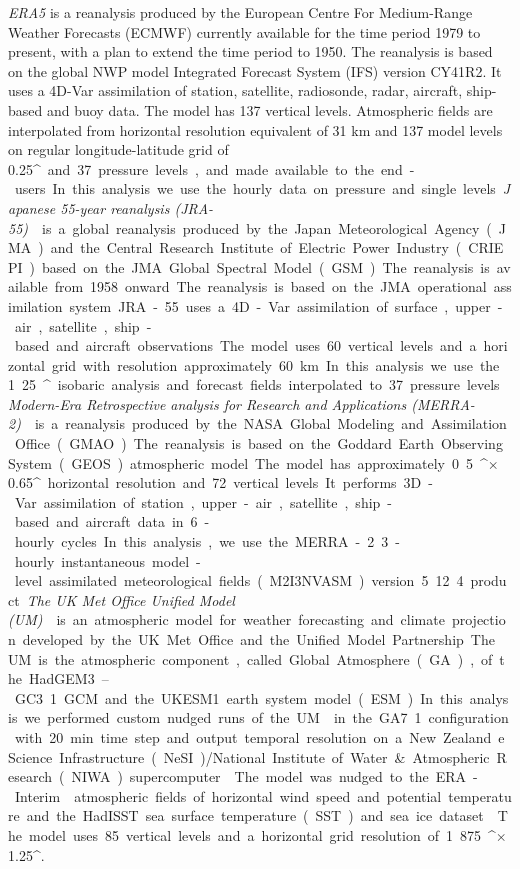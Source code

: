 \textit{ERA5} \citep{era5} is a reanalysis produced by the European Centre
For Medium-Range Weather Forecasts (ECMWF) currently available for the time
period 1979 to present, with a plan to extend the time period to 1950.
The reanalysis is based on the global NWP model Integrated Forecast System (IFS)
version CY41R2. It uses a 4D-Var assimilation of station, satellite,
radiosonde, radar, aircraft, ship-based and buoy data. The model has 137
vertical levels. Atmospheric fields are interpolated from horizontal resolution
equivalent of 31 km and 137 model levels on regular longitude-latitude grid
of 0.25\unit{^\circ} and 37 pressure levels, and made available to the end-users.
In this analysis we use the hourly data on pressure and single levels.

\textit{Japanese 55-year reanalysis (JRA-55)} \citep{ebita2011,kobayashi2015,harada2016}
is a global reanalysis produced by the
Japan Meteorological Agency (JMA) and the Central Research Institute of Electric
Power Industry (CRIEPI) based on the JMA Global Spectral Model (GSM).
The reanalysis is available from 1958 onward.
The reanalysis is based on the JMA operational assimilation system.
JRA-55 uses a 4D-Var assimilation of surface, upper-air, satellite, ship-based
and aircraft observations. The model uses 60 vertical levels and a horizontal
grid with resolution approximately 60 km. In this analysis we
use the 1.25\unit{^\circ} isobaric analysis and forecast fields interpolated to
37 pressure levels.

\textit{Modern-Era Retrospective analysis for Research and Applications
(MERRA-2)} \citep{gelaro2017}
is a reanalysis produced by the NASA Global Modeling and Assimilation Office (GMAO).
The reanalysis is based on the Goddard Earth Observing System (GEOS) atmospheric
model. The model has approximately 0.5\unit{^\circ}$\times$0.65\unit{^\circ} horizontal
resolution and 72 vertical levels. It performs 3D-Var assimilation of
station, upper-air, satellite, ship-based and aircraft data in 6-hourly
cycles. In this analysis, we use the MERRA-2 3-hourly instantaneous
model-level assimilated meteorological fields (M2I3NVASM) version 5.12.4 product.

\textit{The UK Met Office Unified Model (UM)} \citep{walters2019}
is an atmospheric model for weather forecasting and climate projection
developed by the UK Met Office and the Unified Model Partnership. The UM is the atmospheric
component, called Global Atmosphere (GA), of the HadGEM3–GC3.1 GCM and the UKESM1
earth system model (ESM). In this analysis we performed custom nudged
runs of the UM \citep{telford2008} in the GA7.1 configuration with 20 min.
time step and output temporal resolution
on a New Zealand eScience Infrastructure (NeSI)/National Institute of Water \& Atmospheric Research (NIWA) supercomputer \citep{williams2016}.
The model was nudged to the ERA-Interim \citep{dee2011} atmospheric fields of horizontal wind speed and potential temperature and the HadISST sea surface temperature (SST) and sea ice dataset
\citep{rayner2003}. The model uses 85 vertical levels and a horizontal grid
resolution of 1.875\unit{^\circ}$\times$1.25\unit{^\circ}.

